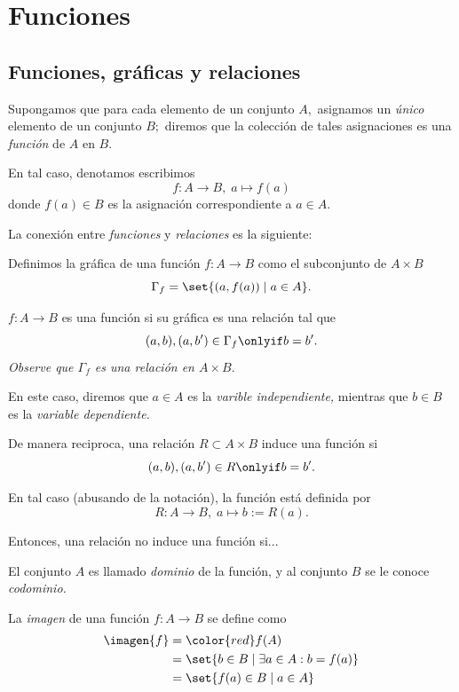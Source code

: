 \section{Funciones}

\subsection{Funciones, gráficas y relaciones}

Supongamos que para cada elemento de un conjunto $A,$ asignamos un \emph{único} elemento de un conjunto $B;$ diremos que la colección de tales asignaciones es una \emph{función} de $A$ en $B.$ 


En tal caso, denotamos escribimos 
$$f:A\to B, \; a \mapsto f(a)$$
donde $f(a)\in B$ es la asignación correspondiente a $a\in A.$



La conexión entre \emph{funciones} y \emph{relaciones} es la siguiente:


Definimos la gráfica de una función $f:A\to B$ como el subconjunto de $A \times B$
$$
\Gamma_{f}=\set{(a, f(a)) \mid a \in A}.
$$


 $f:A\to B$ es una función si su gráfica es una relación tal que $$(a,b), (a,b')\in \Gamma_{f} \onlyif b=b'.$$  
\emph{Observe que $\Gamma_{f}$ es una relación en $A\times B.$}

En este caso, diremos que $a\in A$ es la \emph{varible independiente,} mientras que $b\in B$ es la \emph{variable dependiente.}



De manera reciproca, una relación $R\subset A \times B$ induce una función si 
$$
(a,b), (a,b')\in R \onlyif b=b'.
$$


En tal caso (abusando de la notación), la función está definida por 
$$
R:A\to B, \; a \mapsto b:=R(a).
$$



Entonces, una relación no induce una función si...


El conjunto $A$ es llamado \emph{dominio} de la función, y al conjunto $B$ se le conoce \emph{codominio.}


La \emph{imagen} de una función $f:A\to B$ se define como
\begin{align*}
	\imagen{f}&={\color{red} f(A)}\\
	&=\set{b \in B \mid \exists a \in A: b=f(a)}\\
	&=\set{f(a)\in B \mid a \in A}
\end{align*}

